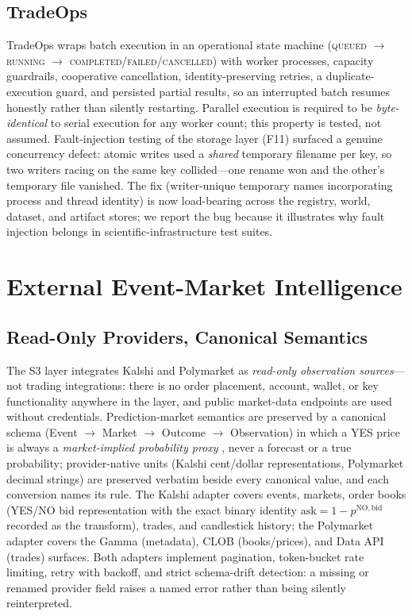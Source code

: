 \documentclass[conference]{IEEEtran}
\begin{document}
\subsection{TradeOps}
TradeOps wraps batch execution in an operational state machine
(\textsc{queued} $\rightarrow$ \textsc{running} $\rightarrow$
\textsc{completed}/\textsc{failed}/\textsc{cancelled}) with worker
processes, capacity guardrails, cooperative cancellation,
identity-preserving retries, a duplicate-execution guard, and persisted
partial results, so an interrupted batch resumes honestly rather than
silently restarting. Parallel execution is required to be
\emph{byte-identical} to serial execution for any worker count; this
property is tested, not assumed. Fault-injection testing of the storage
layer (F11) surfaced a genuine concurrency defect: atomic writes used a
\emph{shared} temporary filename per key, so two writers racing on the
same key collided---one rename won and the other's temporary file
vanished. The fix (writer-unique temporary names incorporating process
and thread identity) is now load-bearing across the registry, world,
dataset, and artifact stores; we report the bug because it illustrates
why fault injection belongs in scientific-infrastructure test suites.

\section{External Event-Market Intelligence}
\label{sec:external}

\subsection{Read-Only Providers, Canonical Semantics}
The S3 layer integrates Kalshi \cite{kalshiapi} and Polymarket
\cite{polymarketapi} as \emph{read-only observation sources}---not
trading integrations: there is no order placement, account, wallet, or
key functionality anywhere in the layer, and public market-data
endpoints are used without credentials. Prediction-market semantics are
preserved by a canonical schema (Event $\rightarrow$ Market
$\rightarrow$ Outcome $\rightarrow$ Observation) in which a YES price
is always a \emph{market-implied probability proxy}
\cite{wolfers2004,arrow2008}, never a forecast or a true probability;
provider-native units (Kalshi cent/dollar representations, Polymarket
decimal strings) are preserved verbatim beside every canonical value,
and each conversion names its rule. The Kalshi adapter covers events,
markets, order books (YES/NO bid representation with the exact binary
identity $\mathrm{ask} = 1 - p^{\mathrm{NO,bid}}$ recorded as the
transform), trades, and candlestick history; the Polymarket adapter
covers the Gamma (metadata), CLOB (books/prices), and Data API (trades)
surfaces. Both adapters implement pagination, token-bucket rate
limiting, retry with backoff, and strict schema-drift detection: a
missing or renamed provider field raises a named error rather than
being silently reinterpreted.
\end{document}
